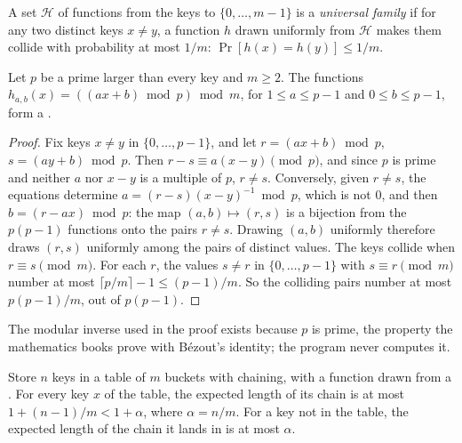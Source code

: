 \begin{definition}\label{def:b2:randomised-algorithms:universal}
A set $\mathcal{H}$ of functions from the keys to $\{0, \dots, m - 1\}$ is a \emph{universal family} if for any two distinct keys $x \neq y$, a function $h$ drawn uniformly from $\mathcal{H}$
makes them collide with probability at most $1/m$: $\Pr[h(x) = h(y)] \leq 1/m$.
\end{definition}

\begin{theorem}\label{thm:b2:randomised-algorithms:carter-wegman}
Let $p$ be a prime larger than every key and $m \geq 2$. The functions $h_{a,b}(x) = ((ax + b) \bmod p) \bmod m$, for
$1 \leq a \leq p - 1$ and $0 \leq b \leq p - 1$, form a .
\end{theorem}

\begin{proof}
Fix keys $x \neq y$ in $\{0, \dots, p - 1\}$, and let $r = (ax + b) \bmod p$, $s = (ay + b) \bmod p$. Then $r - s \equiv
a(x - y) \pmod p$, and since $p$ is prime and neither $a$ nor $x - y$ is a multiple of $p$, $r \neq s$. Conversely, given
$r \neq s$, the equations determine $a = (r - s)(x - y)^{-1} \bmod p$, which is not $0$, and then $b = (r - ax) \bmod p$:
the map $(a, b) \mapsto (r, s)$ is a bijection from the $p(p - 1)$ functions onto the pairs $r \neq s$. Drawing $(a, b)$
uniformly therefore draws $(r, s)$ uniformly among the pairs of distinct values. The keys collide when $r \equiv s
\pmod m$. For each $r$, the values $s \neq r$ in $\{0, \dots, p - 1\}$ with $s \equiv r \pmod m$ number at most $\lceil p/m
\rceil - 1 \leq (p - 1)/m$. So the colliding pairs number at most $p(p - 1)/m$, out of $p(p - 1)$.
\end{proof}

The modular inverse used in the proof exists because $p$ is prime, the property the mathematics books prove with
B\'ezout's identity; the program never computes it.

\begin{corollary}\label{cor:b2:randomised-algorithms:chains}
Store $n$ keys in a table of $m$ buckets with chaining, with a function drawn from a . For every key $x$
of the table, the expected length of its chain is at most $1 + (n - 1)/m < 1 + \alpha$, where $\alpha = n/m$. For a key
not in the table, the expected length of the chain it lands in is at most $\alpha$.
\end{corollary}

